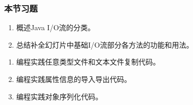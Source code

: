 \begin{frame}
  \frametitle{本节习题}

  
  \begin{enumerate}
  \item 概述Java I/O流的分类。
  \item 总结补全幻灯片中基础I/O流部分各方法的功能和用法。
  \end{enumerate}

  
  \begin{enumerate}
  \item 编程实践任意类型文件和文本文件复制代码。
  \item 编程实践属性信息的导入导出代码。
  \item 编程实践对象序列化代码。
  \end{enumerate}
\end{frame}

